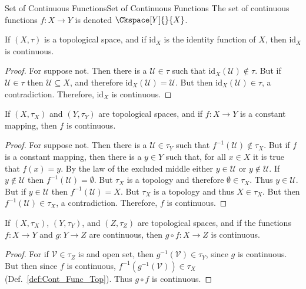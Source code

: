     \begin{fnotation}{Set of Continuous Functions}{Set of Continuous Functions}
        The set of continuous functions $f:{X}\rightarrow{Y}$ is denoted
        $\Ckspace[Y]{}{X}$. \end{fnotation}
    \begin{theorem}
        If $(X,\tau)$ is a topological space, and if $\textrm{id}_{X}$ is the
        identity function of $X$, then $\textrm{id}_{X}$ is continuous.
    \end{theorem}
    \begin{proof}
        For suppose not. Then there is a $\mathcal{U}\in\tau$ such that
        $\textrm{id}_{X}(\mathcal{U})\notin\tau$. But if $\mathcal{U}\in\tau$
        then $\mathcal{U}\subseteq{X}$, and therefore
        $\textrm{id}_{X}(\mathcal{U})=\mathcal{U}$. But then
        $\textrm{id}_{X}(\mathcal{U})\in\tau$, a contradiction. Therefore,
        $\textrm{id}_{X}$ is continuous.
    \end{proof}
    \begin{theorem}
        If $(X,\tau_{X})$ and $(Y,\tau_{Y})$ are topological spaces, and if
        $f:X\rightarrow{Y}$ is a constant mapping, then $f$ is continuous.
    \end{theorem}
    \begin{proof}
        For suppose not. Then there is a $\mathcal{U}\in\tau_{Y}$ such that
        $f^{\minus{1}}(\mathcal{U})\notin\tau_{X}$. But if $f$ is a constant
        mapping, then there is a $y\in{Y}$ such that, for all $x\in{X}$ it is
        true that $f(x)=y$. By the law of the excluded middle either
        $y\in\mathcal{U}$ or $y\notin\mathcal{U}$. If $y\notin\mathcal{U}$ then
        $f^{\minus{1}}(\mathcal{U})=\emptyset$. But $\tau_{X}$ is a topology and
        therefore $\emptyset\in\tau_{X}$. Thus $y\in\mathcal{U}$. But if
        $y\in\mathcal{U}$ then $f^{\minus{1}}(\mathcal{U})=X$. But $\tau_{X}$ is
        a topology and thus $X\in\tau_{X}$. But then
        $f^{\minus{1}}(\mathcal{U})\in\tau_{X}$, a contradiction. Therefore,
        $f$ is continuous.
    \end{proof}
    \begin{theorem}
        If $(X,\tau_{X})$, $(Y,\tau_{Y})$, and $(Z,\tau_{Z})$ are topological
        spaces, and if the functions $f:X\rightarrow{Y}$ and $g:Y\rightarrow{Z}$
        are continuous, then $g\circ{f}:X\rightarrow{Z}$ is continuous.
    \end{theorem}
    \begin{proof}
        For if $\mathcal{V}\in\tau_{Z}$ is and open set, then
        $g^{\minus{1}}(\mathcal{V})\in\tau_{Y}$, since $g$ is continuous. But
        then since $f$ is continuous,
        $f^{\minus{1}}(g^{\minus{1}}(\mathcal{V}))\in\tau_{X}$
        (Def.~\ref{def:Cont_Func_Top}). Thus $g\circ{f}$ is continuous.
    \end{proof}
